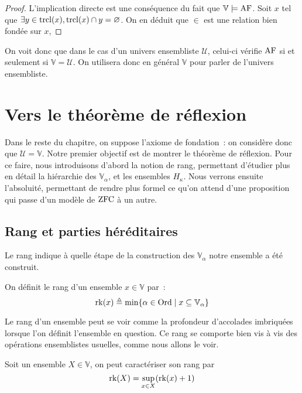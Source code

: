 \begin{proof}
  L'implication directe est une conséquence du fait que $\mathbb V\models \operatorname{AF}$.
  Soit $x$ tel que $\exists y \in \operatorname{trcl}(x), \operatorname{trcl}(x) \cap y = \varnothing$. On
  en déduit que $\in$ est une relation bien fondée sur $x$, 
\end{proof}

On voit donc que dans le cas d'un univers ensembliste $\mathcal U$, celui-ci
vérifie $\operatorname{AF}$ si et seulement si $\mathbb V = \mathcal U$. On utilisera donc en
général $\mathbb V$ pour parler de l'univers ensembliste.

\section{Vers le théorème de réflexion}

Dans le reste du chapitre, on suppose l'axiome de fondation~: on considère donc
que $\mathcal U = \mathbb V$. Notre premier objectif est de montrer le théorème
de réflexion. Pour ce faire, nous introduisons d'abord la notion de rang,
permettant d'étudier plus en détail la hiérarchie des $\mathbb V_\alpha$, et les
ensembles $H_\kappa$. Nous verrons ensuite l'absoluité, permettant de rendre plus
formel ce qu'on attend d'une proposition qui passe d'un modèle de $\operatorname{ZFC}$ à un
autre.

\subsection{Rang et parties héréditaires}

Le rang indique à quelle étape de la construction des $\mathbb V_\alpha$ notre
ensemble a été construit.

\begin{definition}[Rang]
  On définit le rang d'un ensemble $x\in\mathbb V$ par~:
  \[\operatorname{rk}(x) \triangleq \min \{\alpha \in \operatorname{Ord}\mid x\subseteq \mathbb V_\alpha\}\]
\end{definition}

Le rang d'un ensemble peut se voir comme la profondeur d'accolades imbriquées
lorsque l'on définit l'ensemble en question. Ce rang se comporte bien vis à vis
des opérations ensemblistes usuelles, comme nous allons le voir.

\begin{proposition}\label{prop.cara.rk}
  Soit un ensemble $X\in\mathbb V$, on peut caractériser son rang par
  \[\operatorname{rk}(X) = \sup_{x \in X} (\operatorname{rk}(x) + 1)\]
\end{proposition}

